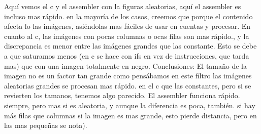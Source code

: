 Aquí vemos el c y el assembler con la figuras aleatorias, aquí el assembler es incluso mas rápido. en la mayoría de los casos, creemos que porque el contenido afecta lo las imágenes, asiéndolas mas fáciles de usar en cuentas y procesar. En cuanto al c,   las imágenes con pocas columnas o ocas filas son mas rápido., y la discrepancia es menor entre las imágenes grandes que las constante. Esto se debe a que saturamos menos (en c se hace con ifs en vez de instrucciones, que tarda mas) que con una imagen totalmente en negro. 
\hfill \break
Conclusiones: El tamaño de la imagen no es un factor tan grande como pensábamos en este filtro las imágenes aleatorias grandes se procesan mas rápido. en  el c que las constantes, pero si se revierten los tamanos, tenemos algo parecido. El assembler funciona rápido. siempre, pero mas si es aleatoria, y aunque la diferencia es poca, también. si hay más filas que columnas si la imagen es mas grande, esto pierde distancia, pero en las mas pequeñas se nota).
